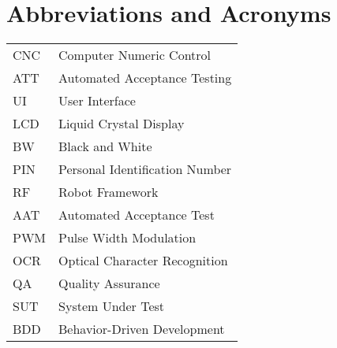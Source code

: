 
\chapter*{Abbreviations and Acronyms}


\noindent
\begin{longtable}{@{}p{}p{}@{}}
CNC & Computer Numeric Control \\
ATT & Automated Acceptance Testing \\
UI & User Interface \\
LCD & Liquid Crystal Display \\
BW & Black and White \\
PIN & Personal Identification Number \\
RF & Robot Framework \\
AAT & Automated Acceptance Test \\
PWM & Pulse Width Modulation \\
OCR & Optical Character Recognition \\
QA & Quality Assurance \\
SUT & System Under Test \\
BDD & Behavior-Driven Development \\

\end{longtable}
